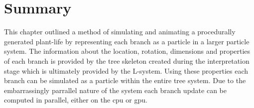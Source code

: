 \section{Summary}

This chapter outlined a method of simulating and animating a procedurally generated plant-life by representing each branch as a  particle in a larger particle system. The information about the location, rotation, dimensions and properties of each branch is provided by the tree skeleton created during the interpretation stage which is ultimately provided by the L-system. Using these properties each branch can be simulated as a particle within the entire tree system. Due to the embarrassingly parrallel nature of the system each branch update can be computed in parallel, either on the \acrshort{cpu} or \acrshort{gpu}.    

